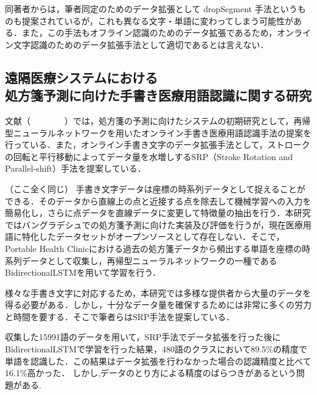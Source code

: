 同著者からは，筆者同定のためのデータ拡張として dropSegment 手法というものも提案されているが\cite{yang16:dropsegment}，これも異なる文字・単語に変わってしまう可能性がある．また，この手法もオフライン認識のためのデータ拡張であるため，オンライン文字認識のためのデータ拡張手法として適切であるとは言えない．

\subsection{遠隔医療システムにおける\\処方箋予測に向けた手書き医療用語認識に関する研究}
文献（　　　　）では，処方箋の予測に向けたシステムの初期研究として，再帰型ニューラルネットワークを用いたオンライン手書き医療用語認識手法の提案を行っている．また，オンライン手書き文字のデータ拡張手法として，ストロークの回転と平行移動によってデータ量を水増しするSRP（Stroke Rotation and Parallel-shift）手法を提案している．

（ここ全く同じ）
手書き文字データは座標の時系列データとして捉えることができる．そのデータから直線上の点と近接する点を除去して機械学習への入力を簡易化し，さらに点データを直線データに変更して特徴量の抽出を行う．本研究ではバングラデシュでの処方箋予測に向けた実装及び評価を行うが，現在医療用語に特化したデータセットがオープンソースとして存在しない．そこで，Portable Health Clinicにおける過去の処方箋データから頻出する単語を座標の時系列データとして収集し，再帰型ニューラルネットワークの一種であるBidirectionalLSTMを用いて学習を行う．

様々な手書き文字に対応するため，本研究では多様な提供者から大量のデータを得る必要がある．しかし，十分なデータ量を確保するためには非常に多くの労力と時間を要する．そこで筆者らはSRP手法を提案している．

収集した15991語のデータを用いて，SRP手法でデータ拡張を行った後にBidirectionalLSTMで学習を行った結果，480語のクラスにおいて89.5\%の精度で単語を認識した．この結果はデータ拡張を行わなかった場合の認識精度と比べて16.1\%高かった．
しかし,データのとり方による精度のばらつきがあるという問題がある.

